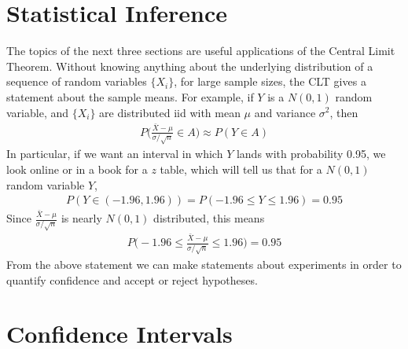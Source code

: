 \documentclass{tufte-book}
\theoremstyle{definition}
\numberwithin{theorem}{section}
\numberwithin{definition}{section}
\numberwithin{lemma}{section}
\numberwithin{corollary}{section}
\numberwithin{proposition}{section}
\numberwithin{remark}{section}
\numberwithin{claim}{section}
\numberwithin{observation}{section}
\numberwithin{fact}{section}
\numberwithin{assumption}{section}
\numberwithin{example}{section}
\numberwithin{exercise}{section}
\begin{document}
\chapter*{Statistical Inference}

The topics of the next three sections are useful applications of the Central Limit Theorem. Without knowing anything about the underlying distribution of a sequence of random variables $\{X_i\}$, for large sample sizes, the CLT gives a statement about the sample means. For example, if $Y$ is a $N(0,1)$ random variable, and $\{X_i\}$ are distributed iid with mean $\mu$ and variance $\sigma^2$, then 
\begin{align*}
P\Big(\frac{\bar{X}- \mu}{\sigma/\sqrt{n}} \in A \Big) \approx P(Y \in A)
\end{align*}
In particular, if we want an interval in which $Y$ lands with probability 0.95, we look online or in a book for a $z$ table, which will tell us that for a $N(0,1)$ random variable $Y$,
\begin{align*}
P(Y \in (-1.96,1.96)) = P(-1.96 \leq Y \leq 1.96) = 0.95
\end{align*}
Since $\frac{\bar{X}- \mu}{\sigma/\sqrt{n}}$ is nearly $N(0,1)$ distributed, this means
\begin{align*}
P\Big(-1.96 \leq \frac{\bar{X}- \mu}{\sigma/\sqrt{n}} \leq 1.96 \Big) = 0.95
\end{align*}
From the above statement we can make statements about experiments in order to quantify confidence and accept or reject hypotheses.


\chapter{Confidence Intervals}
\end{document}

